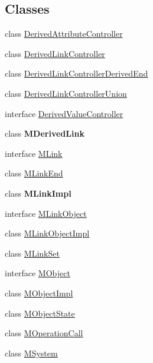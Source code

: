 \subsection*{Classes}
\begin{DoxyCompactItemize}
\item 
class \hyperlink{classorg_1_1tzi_1_1use_1_1uml_1_1sys_1_1_derived_attribute_controller}{Derived\-Attribute\-Controller}
\item 
class \hyperlink{classorg_1_1tzi_1_1use_1_1uml_1_1sys_1_1_derived_link_controller}{Derived\-Link\-Controller}
\item 
class \hyperlink{classorg_1_1tzi_1_1use_1_1uml_1_1sys_1_1_derived_link_controller_derived_end}{Derived\-Link\-Controller\-Derived\-End}
\item 
class \hyperlink{classorg_1_1tzi_1_1use_1_1uml_1_1sys_1_1_derived_link_controller_union}{Derived\-Link\-Controller\-Union}
\item 
interface \hyperlink{interfaceorg_1_1tzi_1_1use_1_1uml_1_1sys_1_1_derived_value_controller}{Derived\-Value\-Controller}
\item 
class {\bfseries M\-Derived\-Link}
\item 
interface \hyperlink{interfaceorg_1_1tzi_1_1use_1_1uml_1_1sys_1_1_m_link}{M\-Link}
\item 
class \hyperlink{classorg_1_1tzi_1_1use_1_1uml_1_1sys_1_1_m_link_end}{M\-Link\-End}
\item 
class {\bfseries M\-Link\-Impl}
\item 
interface \hyperlink{interfaceorg_1_1tzi_1_1use_1_1uml_1_1sys_1_1_m_link_object}{M\-Link\-Object}
\item 
class \hyperlink{classorg_1_1tzi_1_1use_1_1uml_1_1sys_1_1_m_link_object_impl}{M\-Link\-Object\-Impl}
\item 
class \hyperlink{classorg_1_1tzi_1_1use_1_1uml_1_1sys_1_1_m_link_set}{M\-Link\-Set}
\item 
interface \hyperlink{interfaceorg_1_1tzi_1_1use_1_1uml_1_1sys_1_1_m_object}{M\-Object}
\item 
class \hyperlink{classorg_1_1tzi_1_1use_1_1uml_1_1sys_1_1_m_object_impl}{M\-Object\-Impl}
\item 
class \hyperlink{classorg_1_1tzi_1_1use_1_1uml_1_1sys_1_1_m_object_state}{M\-Object\-State}
\item 
class \hyperlink{classorg_1_1tzi_1_1use_1_1uml_1_1sys_1_1_m_operation_call}{M\-Operation\-Call}
\item 
class \hyperlink{classorg_1_1tzi_1_1use_1_1uml_1_1sys_1_1_m_system}{M\-System}

\end{DoxyCompactItemize}

